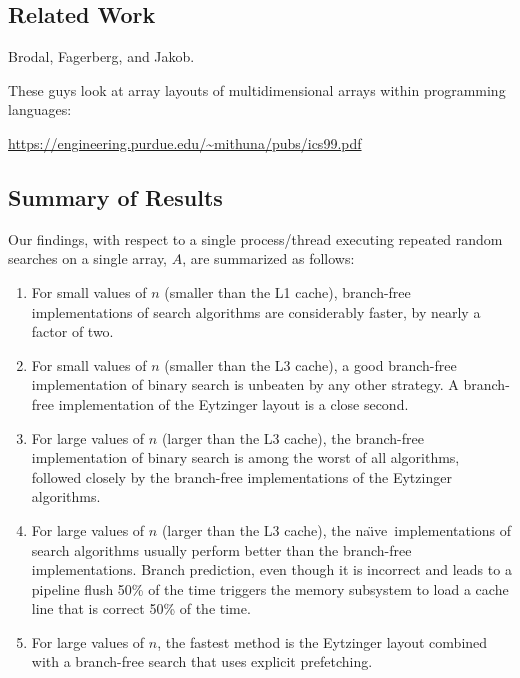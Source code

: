 \documentclass{patmorin}
\newcommand{\naive}{na\"{\i}ve}
\begin{document}
\subsection{Related Work}

Brodal, Fagerberg, and Jakob.


These guys look at array layouts of multidimensional arrays within programming languages:

\url{https://engineering.purdue.edu/~mithuna/pubs/ics99.pdf}


\subsection{Summary of Results}

Our findings, with respect to a single process/thread executing repeated random
searches on a single array, $A$, are summarized as follows:

\begin{enumerate}
  \item For small values of $n$ (smaller than the L1 cache), branch-free
    implementations of search algorithms are considerably faster, by nearly
    a factor of two.
  
  \item For small values of $n$ (smaller than the L3 cache), a good
    branch-free implementation of binary search is unbeaten by any other
    strategy.  A branch-free implementation of the Eytzinger layout is a
    close second.
  
  \item For large values of $n$ (larger than the L3 cache), the branch-free
    implementation of binary search is among the worst of all algorithms,
    followed closely by the branch-free implementations of the Eytzinger
    algorithms.
  
  \item For large values of $n$ (larger than the L3 cache), the \naive\
    implementations of search algorithms usually perform better than the
    branch-free implementations.  Branch prediction, even though it is
    incorrect and leads to a pipeline flush 50\% of the time triggers
    the memory subsystem to load a cache line that is correct 50\%
    of the time.  

  \item For large values of $n$, the fastest method is the Eytzinger layout
   combined with a branch-free search that uses explicit prefetching.
\end{enumerate}
\end{document}
